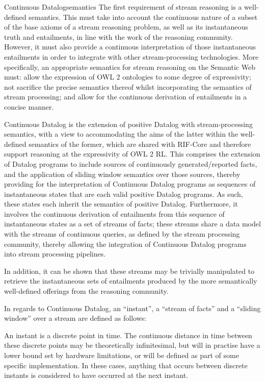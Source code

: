 \begin{nestedsection}{Continuous Datalog}{semantics}
The first requirement of stream reasoning is a well-defined semantics.
This must take into account the continuous nature of a subset of the
base axioms of a stream reasoning problem, as well as its
instantaneous truth and entailments, in line with the work of the
reasoning community.  However, it must also provide a continuous
interpretation of those instantaneous entailments in order to
integrate with other stream-processing technologies.  More
specifically, an appropriate semantics for stream reasoning on the
Semantic Web must: allow the expression of OWL 2 ontologies to some
degree of expressivity; not sacrifice the precise semantics thereof
whilst incorporating the semantics of stream processing; and allow for
the continuous derivation of entailments in a concise manner.

	Continuous Datalog is the extension of positive Datalog with stream-processing semantics, with a view to accommodating the aims of the latter within the well-defined semantics of the former, which are shared with RIF-Core and therefore support reasoning at the expressivity of OWL 2 RL.
	This comprises the extension of Datalog programs to include sources of continuously generated/reported facts, and the application of sliding window semantics over those sources, thereby providing for the interpretation of Continuous Datalog programs as sequences of instantaneous states that are each valid positive Datalog programs.
	As such, these states each inherit the semantics of positive Datalog.
	Furthermore, it involves the continuous derivation of entailments from this sequence of instantaneous states as a set of streams of facts;
	these streams share a data model with the streams of continuous queries, as defined by the stream processing community, thereby allowing the integration of Continuous Datalog programs into stream processing pipelines.

In addition, it can be shown that these streams may be trivially
manipulated to retrieve the instantaneous sets of entailments produced
by the more semantically well-defined offerings from the reasoning
community.

	In regards to Continuous Datalog, an ``instant'', a ``stream of facts'' and a ``sliding window'' over a stream are defined as follows:

\begin{definition}[Instant]\label{def:continuous datalog: instant}
An instant is a discrete point in time.  The continuous distance in
time between these discrete points may be theoretically infinitesimal,
but will in practise have a lower bound set by hardware limitations,
or will be defined as part of some specific implementation.  In these
cases, anything that occurs between discrete instants is considered to
have occurred at the next instant.
\end{definition}


\end{nestedsection}
